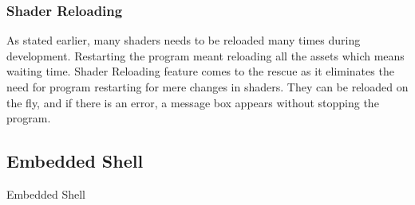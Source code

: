 \subsubsection{Shader Reloading}
As stated earlier, many shaders needs to be reloaded many times during development. Restarting
the program meant reloading all the assets which means waiting time. Shader Reloading feature
comes to the rescue as it eliminates the need for program restarting for mere changes in shaders.
They can be reloaded on the fly, and if there is an error, a message box appears without stopping
the program.

\subsection{Embedded Shell}
Embedded Shell
